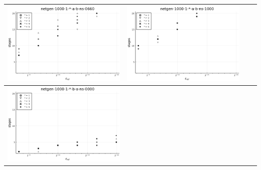 \documentclass{article}
\begin{document}
\begin{landscape}
\begin{center}
\begin{longtable}{| c | c | c | c |}
\includegraphics[height=0.22\textheight]{hiter_fixlim_netgen-1000-1-_-a-b-ns-0660.png} &
\includegraphics[height=0.22\textheight]{hiter_fixlim_netgen-1000-1-_-a-b-ns-1000.png} \\
                \hline
\includegraphics[height=0.22\textheight]{hiter_fixlim_netgen-1000-1-_-b-a-ns-0000.png} &

\end{longtable}
\end{center}
\end{landscape}
\end{document}
